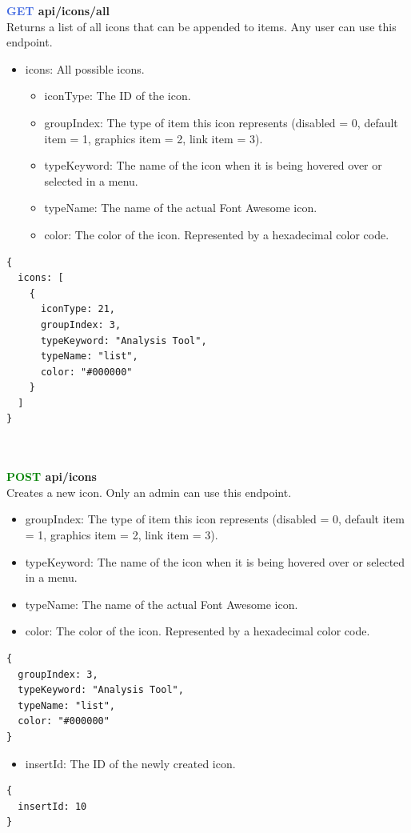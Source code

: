 \documentclass[onecolumn, draftclsnofoot,10pt, compsoc, usenames, dvipsnames]{IEEEtran}
\begin{document}
\noindent
\textbf{\textcolor{RoyalBlue}{GET} api/icons/all} \\
Returns a list of all icons that can be appended to items. Any user can use this endpoint.
\begin{itemize}
    \item icons: All possible icons.
    \begin{itemize}
        \item iconType: The ID of the icon.
        \item groupIndex: The type of item this icon represents (disabled = 0, default item = 1, graphics item = 2, link item = 3).
        \item typeKeyword: The name of the icon when it is being hovered over or selected in a menu.
        \item typeName: The name of the actual Font Awesome icon.
        \item color: The color of the icon. Represented by a hexadecimal color code.
    \end{itemize}
\end{itemize}
\begin{lstlisting}[caption=Example Response]
{ 
  icons: [
    {
      iconType: 21,
      groupIndex: 3,
      typeKeyword: "Analysis Tool",
      typeName: "list",
      color: "#000000"
    }
  ]
}
\end{lstlisting}
\\~\\


\noindent
\textbf{\textcolor{Green}{POST} api/icons} \\
Creates a new icon. Only an admin can use this endpoint.
\begin{itemize}
    \item groupIndex: The type of item this icon represents (disabled = 0, default item = 1, graphics item = 2, link item = 3).
    \item typeKeyword: The name of the icon when it is being hovered over or selected in a menu.
    \item typeName: The name of the actual Font Awesome icon.
    \item color: The color of the icon. Represented by a hexadecimal color code.
\end{itemize}
\begin{lstlisting}[caption=Example Request Body]
{
  groupIndex: 3,
  typeKeyword: "Analysis Tool",
  typeName: "list",
  color: "#000000"
}
\end{lstlisting}
\begin{itemize}
  \item insertId: The ID of the newly created icon.
\end{itemize}
\begin{lstlisting}[caption=Example Response]
{ 
  insertId: 10
}
\end{lstlisting}
\\~\\
\end{document}
